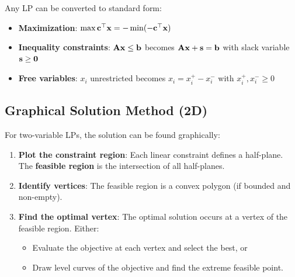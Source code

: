 \begin{keyconceptbox}[title=Converting to Standard Form]
Any LP can be converted to standard form:
\begin{itemize}
    \item \textbf{Maximization}: $\max \mathbf{c}^\top\mathbf{x} = -\min(-\mathbf{c}^\top\mathbf{x})$
    \item \textbf{Inequality constraints}: $\mathbf{A}\mathbf{x} \leq \mathbf{b}$ becomes $\mathbf{A}\mathbf{x} + \mathbf{s} = \mathbf{b}$ with slack variable $\mathbf{s} \geq \mathbf{0}$
    \item \textbf{Free variables}: $x_i$ unrestricted becomes $x_i = x_i^+ - x_i^-$ with $x_i^+, x_i^- \geq 0$
\end{itemize}
\end{keyconceptbox}

\subsection{Graphical Solution Method (2D)}

For two-variable LPs, the solution can be found graphically:

\begin{enumerate}
    \item \textbf{Plot the constraint region}: Each linear constraint defines a half-plane. The \textbf{feasible region} is the intersection of all half-planes.
    \item \textbf{Identify vertices}: The feasible region is a convex polygon (if bounded and non-empty).
    \item \textbf{Find the optimal vertex}: The optimal solution occurs at a vertex of the feasible region. Either:
    \begin{itemize}
        \item Evaluate the objective at each vertex and select the best, or
        \item Draw level curves of the objective and find the extreme feasible point.
    \end{itemize}
\end{enumerate}

